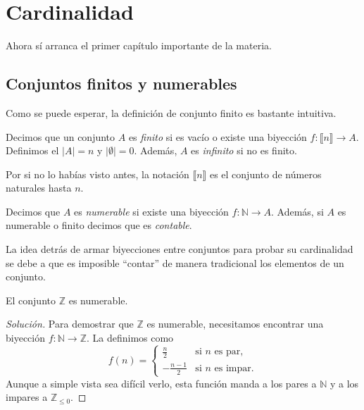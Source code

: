 \chapter{Cardinalidad}

Ahora sí arranca el primer capítulo importante de la materia.

\section{Conjuntos finitos y numerables}

Como se puede esperar, la definición de conjunto finito es bastante intuitiva.

\begin{definition}
	Decimos que un conjunto $A$ es \emph{finito} si es vacío o existe una biyección $f: \llbracket n \rrbracket \to  A$. Definimos el $ \lvert A \rvert = n$ y $ \lvert \emptyset \rvert = 0$. Además, $A$ es \emph{infinito} si no es finito.
\end{definition}

Por si no lo habías visto antes, la notación $\llbracket n \rrbracket$ es el conjunto de números naturales hasta $n$.

\begin{definition}
	Decimos que $A$ es \emph{numerable} si existe una biyección $f: \mathbb{N} \to  A$. Además, si $A$ es numerable o finito decimos que es \emph{contable}.
\end{definition}

La idea detrás de armar biyecciones entre conjuntos para probar su cardinalidad se debe a que es imposible ``contar'' de manera tradicional los elementos de un conjunto.

\begin{example}
	El conjunto $\mathbb{Z}$ es numerable.
\end{example}

\begin{proof}[Solución]
	Para demostrar que $\mathbb{Z}$ es numerable, necesitamos encontrar una biyección $f : \mathbb{N} \to \mathbb{Z}$. La definimos como
	\begin{equation*}
		f(n) = \begin{cases}
			\frac{n}{2}    & \text{si } n \text{ es par},   \\
			-\frac{n-1}{2} & \text{si } n \text{ es impar}.
		\end{cases}
	\end{equation*}
	Aunque a simple vista sea difícil verlo, esta función manda a los pares a $\mathbb{N}$ y a los impares a $\mathbb{Z}_{\leq 0}$.
\end{proof}

